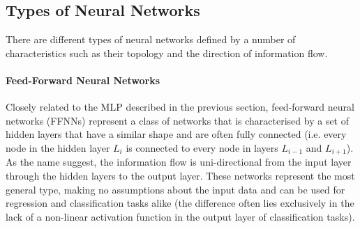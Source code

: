 \subsection{Types of Neural Networks} \label{sec:nn-types}
There are different types of neural networks defined by a number of characteristics such as their topology and the direction of information flow. 

\paragraph{Feed-Forward Neural Networks} Closely related to the MLP described in the previous section, feed-forward neural networks (FFNNs) represent a class of networks that is characterised by a set of hidden layers that have a similar shape and are often fully connected (i.e. every node in the hidden layer $L_i$ is connected to every node in layers $L_{i-1}$ and $L_{i+1}$). As the name suggest, the information flow is uni-directional from the input layer through the hidden layers to the output layer. These networks represent the most general type, making no assumptions about the input data and can be used for regression and classification tasks alike (the difference often lies exclusively in the lack of a non-linear activation function in the output layer of classification tasks).

